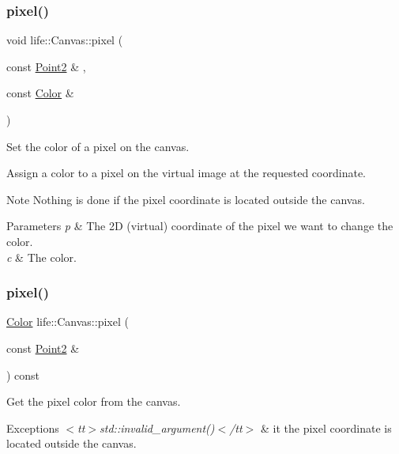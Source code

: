 \subsubsection{\texorpdfstring{pixel()}{pixel()}\hspace{0.1cm}{\footnotesize\ttfamily [1/2]}}
{\footnotesize\ttfamily void life\+::\+Canvas\+::pixel (\begin{DoxyParamCaption}\item[{const \mbox{\hyperlink{structlife_1_1_point2}{Point2}} \&}]{,  }\item[{const \mbox{\hyperlink{structlife_1_1_color}{Color}} \&}]{ }\end{DoxyParamCaption})}



Set the color of a pixel on the canvas. 

Assign a color to a pixel on the virtual image at the requested coordinate.

\begin{DoxyNote}{Note}
Nothing is done if the pixel coordinate is located outside the canvas. 
\end{DoxyNote}

\begin{DoxyParams}{Parameters}
{\em p} & The 2D (virtual) coordinate of the pixel we want to change the color. \\
\hline
{\em c} & The color. \\
\hline
\end{DoxyParams}
\mbox{\label{classlife_1_1_canvas_aa45e2eb2c9fcb732d8a0f748e605b813}} 
\subsubsection{\texorpdfstring{pixel()}{pixel()}\hspace{0.1cm}{\footnotesize\ttfamily [2/2]}}
{\footnotesize\ttfamily \mbox{\hyperlink{structlife_1_1_color}{Color}} life\+::\+Canvas\+::pixel (\begin{DoxyParamCaption}\item[{const \mbox{\hyperlink{structlife_1_1_point2}{Point2}} \&}]{ }\end{DoxyParamCaption}) const}



Get the pixel color from the canvas. 


\begin{DoxyExceptions}{Exceptions}
{\em $<$tt$>$std\+::invalid\+\_\+argument()$<$/tt$>$} & it the pixel coordinate is located outside the canvas. \\
\hline
\end{DoxyExceptions}

